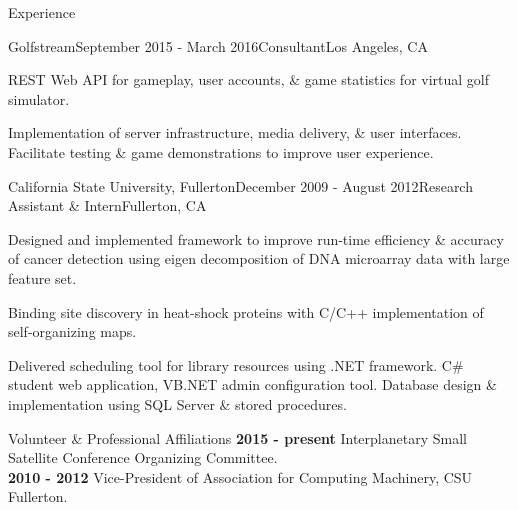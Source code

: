 \documentclass{resume} %
\begin{document}
\begin{rSection}{Experience}


\begin{rSubsection}{Golfstream}{September 2015 - March 2016}{Consultant}{Los Angeles, CA}
\item REST Web API for gameplay, user accounts, \& game statistics for virtual golf simulator. 
\item Implementation of server infrastructure, media delivery, \& user interfaces. Facilitate testing \& game demonstrations to improve user experience.
\end{rSubsection}


\begin{rSubsection}{California State University, Fullerton}{December 2009 - August 2012}{Research Assistant \& Intern}{Fullerton, CA}
\item Designed and implemented framework to improve run-time efficiency \& accuracy of cancer detection using eigen decomposition of DNA microarray data with large feature set.
\item Binding site discovery in heat-shock proteins with C/C++ implementation of self-organizing maps.
\item Delivered scheduling tool for library resources using .NET framework. C\# student web application, VB.NET admin configuration tool. Database design \& implementation using SQL Server \& stored procedures.
\end{rSubsection}

\end{rSection}


\begin{rSection}{Volunteer \& Professional Affiliations}
{\bf 2015 - present } Interplanetary Small Satellite Conference Organizing Committee. \\
{\bf 2010 - 2012} Vice-President of Association for Computing Machinery, CSU Fullerton. 
\end{rSection}



\end{document}
